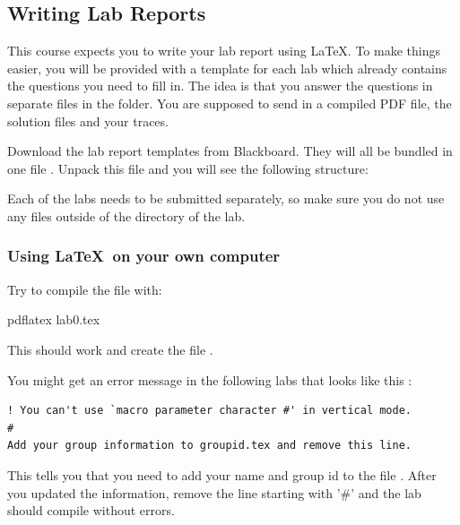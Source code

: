 \subsection*{Writing Lab Reports}
This course expects you to write your lab report using \LaTeX. To make things easier, you will be provided with a template for each lab which already contains the questions you need to fill in. The idea is that you answer the questions in separate files in the  folder. You are supposed to send in a compiled PDF file, the  solution files and your traces.

Download the lab report templates from Blackboard. They will all be bundled in one file . Unpack this file and you will see the following structure:

Each of the labs needs to be submitted separately, so make sure you do not use any files outside of the directory of the lab.

\subsubsection{Using \LaTeX~on your own computer}
Try to compile the  file with:
\begin{cmdblock}[gobble=1]
	pdflatex lab0.tex
\end{cmdblock}
This should work and create the file .

\remark You might get an error message in the following labs that looks like this :
\begin{verbatim}
! You can't use `macro parameter character #' in vertical mode.
#
Add your group information to groupid.tex and remove this line.
\end{verbatim}
This tells you that you need to add your name and group id to the file . After you updated the information, remove the line starting with '\#' and the lab should compile without errors.

